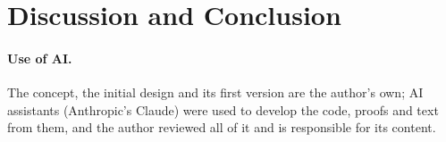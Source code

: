 \documentclass[runningheads]{llncs}
\newif\iffullversion
\begin{document}
\iffullversion
\section{Discussion and Limitations}\label{sec:discussion}
\else
\section{Discussion and Conclusion}\label{sec:discussion}
\fi



\iffullversion
\section{Conclusion}
\fi

\iffullversion
LayerTree specifies a shared output by what it lets members do (join,
leave alone, be evicted after a lease, be swept as a cohort) and realises
it with a tree kept off-chain as data: a one-transaction exit of about a
kilobyte, no pre-signing, no expiry of the shared output, from proposed
opcodes; its price is that all activity funnels through one UTXO.
Future work: a verified compiler, a proof of
Conjecture~\ref{thm:chan}, extending the mechanised path maintenance of
Lemma~\ref{lem:path} to opaque nodes, and a P
model~\cite{plang}.
\else
\fi

\paragraph{Use of AI.} The concept, the initial design and its first
version are the author's own; AI assistants (Anthropic's Claude) were used
to develop the code, proofs and text from them, and the author reviewed
all of it and is responsible for its content.


{\expandafter\def\expandafter\UrlBreaks\expandafter{\UrlBreaks\do\-}%
}

\appendix
\iffullversion




\else





\fi
\end{document}
